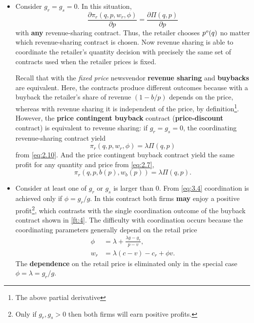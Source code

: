 \begin{itemize}
    \item Consider $g_r=g_s=0$. In this situation,
    \begin{equation*}
        \frac{\partial\pi_r(q,p,w_r,\phi)}{\partial p}=\frac{\partial\Pi(q,p)}{\partial p}
    \end{equation*}
    with \textbf{any} revenue-sharing contract. Thus, the retailer chooses $p^o(q)$ no matter which revenue-sharing contract is chosen. Now revenue sharing is able to coordinate the retailer's quantity decision with precisely the same set of contracts used when the retailer prices is fixed. 

    Recall that with the \textit{fixed price} newsvendor \textbf{revenue sharing} and \textbf{buybacks} are equivalent. Here, the contracts produce different outcomes because with a buyback the retailer's share of revenue $(1-b/p)$ depends on the price, whereas with revenue sharing it is independent of the price, by definition\footnote{The above partial derivative}. However, the \textbf{price contingent buyback} contract (\textbf{price-discount} contract) is equivalent to revenue sharing: if $g_r=g_s=0$, the coordinating revenue-sharing contract yield 
    \begin{equation*}
        \pi_r(q,p,w_r,\phi)=\lambda\Pi(q,p)
    \end{equation*}
    from \autoref{eq:2.10}. And the price contingent buyback contract yield the same profit for any quantity and price from \autoref{eq:2.7},
    \begin{equation*}
        \pi_r(q,p,b(p),w_b(p))=\lambda\Pi(q,p).
    \end{equation*}
    \item Consider at least one of $g_r$ or $g_s$ is larger than $0$. From \autoref{eq:3.4} coordination is achieved only if $\phi=g_r/g$. In this contract both firms \textbf{may} enjoy a positive profit\footnote{Only if $g_r,g_s>0$ then both firms will earn positive profits.}, which contrasts with the single coordination outcome of the buyback contract shown in \autoref{ft:4}. The difficulty with coordination occurs because the coordinating parameters generally depend on the retail price
    \begin{align*}
        \phi&=\lambda+\frac{\lambda g-g_r}{p-v},\\
        w_r&=\lambda(c-v)-c_r+\phi v.
    \end{align*}
    The \textbf{dependence} on the retail price is eliminated only in the special case $\phi=\lambda=g_r/g$.
\end{itemize}


